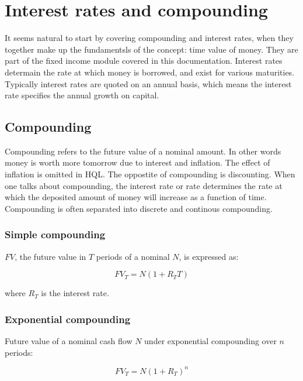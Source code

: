 \documentclass[11pt,a4paper]{article}
\numberwithin{equation}{section}
\begin{document}

	\section{Interest rates and compounding}
	It seems natural to start by covering compounding and interest rates, when they together make up the fundamentsls of the concept: time value of money. They are part of the fixed income module covered in this documentation.
	Interest rates determain the rate at which money is borrowed, and exist for various maturities. Typically interest rates are quoted on an annual basis, which means the 	interest rate specifies the annual growth on capital.

\subsection{Compounding}
	Compounding refers to the future value of a nominal amount. In other words money is worth more tomorrow due to interest and inflation. The effect of inflation is omitted in HQL. The oppostite of compounding is discounting.
	When one talks about compounding, the interest rate or rate determines the rate at which the deposited amount of money will increase as a function of time.
	Compounding is often separated into discrete and continous compounding.


	\subsubsection{Simple compounding}
	$FV$, the future value in $T$ periods of a nominal $N$, is expressed as:

	\[
	FV_T = N(1+R_TT)
	\]

	where $R_T$ is the interest rate.

	\subsubsection{Exponential compounding}

	Future value of a nominal cash flow $N$ under exponential compounding over
	$n$ periods:

	\[ FV_T = N(1+R_T)^n \]

\end{document}
